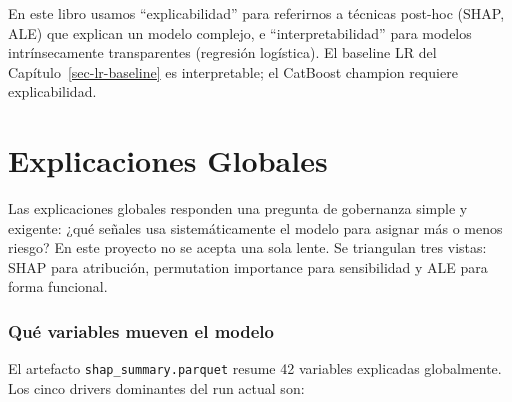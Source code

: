 \documentclass[
  spanish,
  11pt,
  letterpaper,
]{scrbook}
\theoremstyle{plain}
\theoremstyle{remark}
\begin{document}
\begin{tcolorbox}[enhanced jigsaw, arc=.35mm, bottomrule=.15mm, bottomtitle=1mm, breakable, colback=white, colbacktitle=quarto-callout-note-color!10!white, colframe=quarto-callout-note-color-frame, coltitle=black, left=2mm, leftrule=.75mm, opacityback=0, opacitybacktitle=0.6, rightrule=.15mm, title=\textcolor{quarto-callout-note-color}{\faInfo}\hspace{0.5em}{Explicabilidad ≠ Interpretabilidad}, titlerule=0mm, toprule=.15mm, toptitle=1mm]

En este libro usamos ``explicabilidad'' para referirnos a técnicas
post-hoc (SHAP, ALE) que explican un modelo complejo, e
``interpretabilidad'' para modelos intrínsecamente transparentes
(regresión logística). El baseline LR del Capítulo~\ref{sec-lr-baseline}
es interpretable; el CatBoost champion requiere explicabilidad.

\end{tcolorbox}

\chapter{Explicaciones Globales}\label{sec-global-explanations}

Las explicaciones globales responden una pregunta de gobernanza simple y
exigente: ¿qué señales usa sistemáticamente el modelo para asignar más o
menos riesgo? En este proyecto no se acepta una sola lente. Se
triangulan tres vistas: SHAP para atribución, permutation importance
para sensibilidad y ALE para forma funcional.

\subsection{Qué variables mueven el
modelo}\label{quuxe9-variables-mueven-el-modelo}

El artefacto \texttt{shap\_summary.parquet} resume 42 variables
explicadas globalmente. Los cinco drivers dominantes del run actual son:
\end{document}
